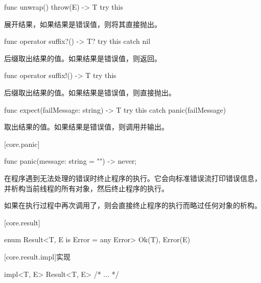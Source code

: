 \begin{itemdecl}
func unwrap() throw(E) -> T {
    try this
}
\end{itemdecl}

\pnum
{}展开结果，如果结果是错误值，则将其直接抛出。

\begin{itemdecl}
func operator suffix?() -> T? {
    try this catch { nil }
}
\end{itemdecl}

\pnum
后缀取出结果的值。如果结果是错误值，则返回。

\begin{itemdecl}
func operator suffix!() -> T {
    try this
}
\end{itemdecl}

\pnum
后缀\tcode{!}取出结果的值。如果结果是错误值，则直接抛出。

\begin{itemdecl}
func expect(failMessage: string) -> T {
    try this catch { panic(failMessage) }
}
\end{itemdecl}

\pnum
{}取出结果的值。如果结果是错误值，则调用并输出。

[core.panic]{}

\begin{itemdecl}
func panic(message: string = "") -> never;
\end{itemdecl}

\pnum
{}在程序遇到无法处理的错误时终止程序的执行。它会向标准错误流打印错误信息，并析构当前线程的所有对象，然后终止程序的执行。

\pnum
如果在执行过程中再次调用了，则会直接终止程序的执行而略过任何对象的析构。

[core.result]{}

\begin{itemdecl}
enum Result<T, E is Error = any Error> {
    Ok(T),
    Error(E)
}
\end{itemdecl}

[core.result.impl]{实现}

\begin{itemdecl}
impl<T, E> Result<T, E> { /* ... */ }
\end{itemdecl}

